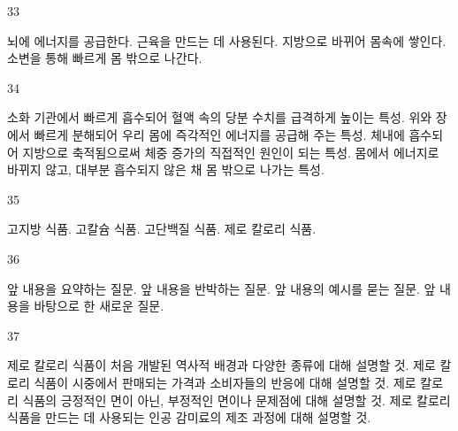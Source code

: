 \documentclass[fs9,seriesFre]{korfarm-base}
\begin{document}
\begin{kfSentenceUnit}{33}{}
\begin{kfChoices}
\kfChoice 뇌에 에너지를 공급한다.
\kfChoice 근육을 만드는 데 사용된다.
\kfChoice 지방으로 바뀌어 몸속에 쌓인다.
\kfChoice 소변을 통해 빠르게 몸 밖으로 나간다.
\end{kfChoices}
\end{kfSentenceUnit}

\begin{kfSentenceUnit}{34}{}
\begin{kfChoices}
\kfChoice 소화 기관에서 빠르게 흡수되어 혈액 속의 당분 수치를 급격하게 높이는 특성.
\kfChoice 위와 장에서 빠르게 분해되어 우리 몸에 즉각적인 에너지를 공급해 주는 특성.
\kfChoice 체내에 흡수되어 지방으로 축적됨으로써 체중 증가의 직접적인 원인이 되는 특성.
\kfChoice 몸에서 에너지로 바뀌지 않고, 대부분 흡수되지 않은 채 몸 밖으로 나가는 특성.
\end{kfChoices}
\end{kfSentenceUnit}

\begin{kfSentenceUnit}{35}{}
\begin{kfChoices}
\kfChoice 고지방 식품.
\kfChoice 고칼슘 식품.
\kfChoice 고단백질 식품.
\kfChoice 제로 칼로리 식품.
\end{kfChoices}
\end{kfSentenceUnit}

\begin{kfSentenceUnit}{36}{}
\begin{kfChoices}
\kfChoice 앞 내용을 요약하는 질문.
\kfChoice 앞 내용을 반박하는 질문.
\kfChoice 앞 내용의 예시를 묻는 질문.
\kfChoice 앞 내용을 바탕으로 한 새로운 질문.
\end{kfChoices}
\end{kfSentenceUnit}

\begin{kfSentenceUnit}{37}{}
\begin{kfChoices}
\kfChoice 제로 칼로리 식품이 처음 개발된 역사적 배경과 다양한 종류에 대해 설명할 것.
\kfChoice 제로 칼로리 식품이 시중에서 판매되는 가격과 소비자들의 반응에 대해 설명할 것.
\kfChoice 제로 칼로리 식품의 긍정적인 면이 아닌, 부정적인 면이나 문제점에 대해 설명할 것.
\kfChoice 제로 칼로리 식품을 만드는 데 사용되는 인공 감미료의 제조 과정에 대해 설명할 것.
\end{kfChoices}
\end{kfSentenceUnit}
\end{document}
